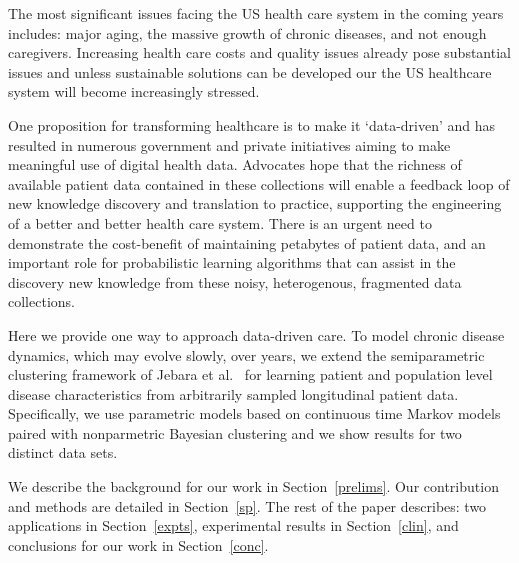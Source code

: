 The most significant issues facing the US health care system in the coming years includes: major aging, the massive growth of chronic diseases, and not enough caregivers.  Increasing health care costs and quality issues already pose substantial issues and unless sustainable solutions can be developed our the US healthcare system will become increasingly stressed.

One proposition for transforming healthcare is to make it `data-driven' and has resulted in numerous government and private initiatives aiming to make meaningful use of digital health data.  Advocates hope that the richness of available patient data contained in these collections will enable a feedback loop of new knowledge discovery and translation to practice, supporting the engineering of a better and better health care system. There is an urgent need to demonstrate the cost-benefit of maintaining petabytes of patient data, and an important role for probabilistic learning algorithms that can assist in the discovery new knowledge from these noisy, heterogenous, fragmented data collections.

Here we provide one way to approach
data-driven care.  To model chronic disease dynamics, which may evolve slowly, over years, we extend the semiparametric clustering framework of Jebara et al.~\cite{JebSonTha07a} for learning patient and population level disease characteristics from arbitrarily sampled longitudinal patient data.  Specifically, we use parametric models based on continuous time Markov models paired with nonparmetric Bayesian clustering and we show results for two distinct data sets.

We describe the background for our work in Section~\ref{prelims}.  Our contribution and methods are detailed in Section~\ref{sp}.  The rest of the paper describes: two applications in Section~\ref{expts}, experimental results in Section~\ref{clin}, and conclusions for our work in Section~\ref{conc}.
